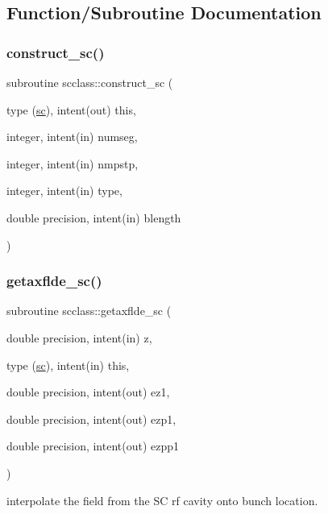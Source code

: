 \subsection{Function/\+Subroutine Documentation}
\mbox{\label{namespacescclass_a117b083b5a5a59d050fe5c0a4771332b}} 
\subsubsection{\texorpdfstring{construct\_sc()}{construct\_sc()}}
{\footnotesize\ttfamily subroutine scclass\+::construct\+\_\+sc (\begin{DoxyParamCaption}\item[{type (\mbox{\hyperlink{namespacescclass_structscclass_1_1sc}{sc}}), intent(out)}]{this,  }\item[{integer, intent(in)}]{numseg,  }\item[{integer, intent(in)}]{nmpstp,  }\item[{integer, intent(in)}]{type,  }\item[{double precision, intent(in)}]{blength }\end{DoxyParamCaption})}

\mbox{\label{namespacescclass_aefc9ea62cf36830e2c74869fff2f1b17}} 
\subsubsection{\texorpdfstring{getaxflde\_sc()}{getaxflde\_sc()}}
{\footnotesize\ttfamily subroutine scclass\+::getaxflde\+\_\+sc (\begin{DoxyParamCaption}\item[{double precision, intent(in)}]{z,  }\item[{type (\mbox{\hyperlink{namespacescclass_structscclass_1_1sc}{sc}}), intent(in)}]{this,  }\item[{double precision, intent(out)}]{ez1,  }\item[{double precision, intent(out)}]{ezp1,  }\item[{double precision, intent(out)}]{ezpp1 }\end{DoxyParamCaption})}



interpolate the field from the SC rf cavity onto bunch location. 

